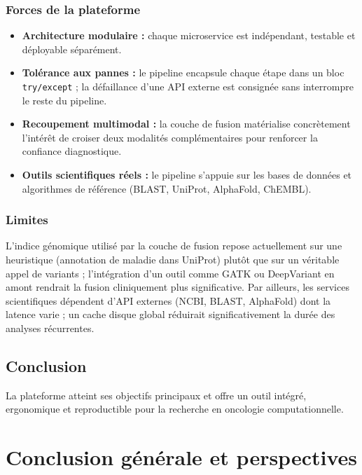 \documentclass[12pt,a4paper,oneside]{book}
\begin{document}
\subsection{Forces de la plateforme}

\begin{itemize}
  \item \textbf{Architecture modulaire :} chaque microservice est
    indépendant, testable et déployable séparément.
  \item \textbf{Tolérance aux pannes :} le pipeline encapsule chaque étape
    dans un bloc \texttt{try/except} ; la défaillance d'une API externe est
    consignée sans interrompre le reste du pipeline.
  \item \textbf{Recoupement multimodal :} la couche de fusion matérialise
    concrètement l'intérêt de croiser deux modalités complémentaires pour
    renforcer la confiance diagnostique.
  \item \textbf{Outils scientifiques réels :} le pipeline s'appuie sur les
    bases de données et algorithmes de référence (BLAST, UniProt,
    AlphaFold, ChEMBL).
\end{itemize}

\subsection{Limites}

L'indice génomique utilisé par la couche de fusion repose actuellement sur
une heuristique (annotation de maladie dans UniProt) plutôt que sur un
véritable appel de variants ; l'intégration d'un outil comme GATK ou
DeepVariant en amont rendrait la fusion cliniquement plus significative.
Par ailleurs, les services scientifiques dépendent d'API externes
(NCBI, BLAST, AlphaFold) dont la latence varie ; un cache disque global
réduirait significativement la durée des analyses récurrentes.

\section*{Conclusion}
La plateforme atteint ses objectifs principaux et offre un outil intégré,
ergonomique et reproductible pour la recherche en oncologie computationnelle.

\chapter*{Conclusion générale et perspectives}
\end{document}
